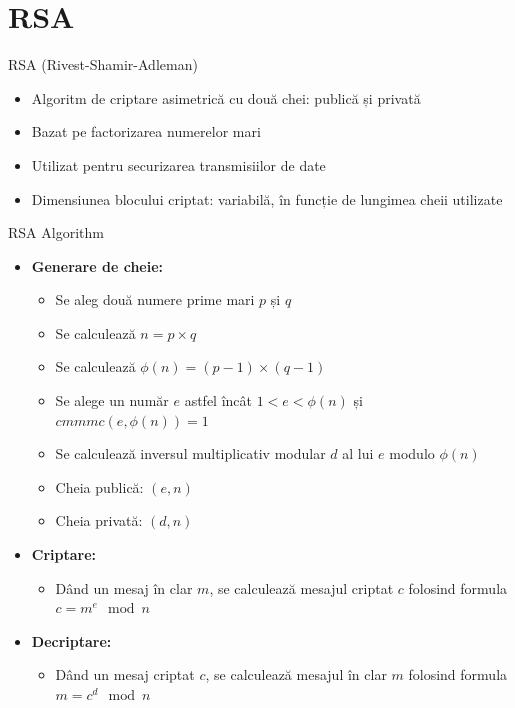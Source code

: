 \documentclass{beamer}
\begin{document}
\section{RSA}

\begin{frame}{RSA (Rivest-Shamir-Adleman)}
  \begin{itemize}
    \item Algoritm de criptare asimetrică cu două chei: publică și privată
    \item Bazat pe factorizarea numerelor mari
    \item Utilizat pentru securizarea transmisiilor de date
    \item Dimensiunea blocului criptat: variabilă, în funcție de lungimea cheii utilizate
  \end{itemize}
\end{frame}

\begin{frame}{RSA Algorithm}
  \begin{itemize}
    \item \textbf{Generare de cheie:}
    \begin{itemize}
      \item Se aleg două numere prime mari $p$ și $q$
      \item Se calculează $n = p \times q$
      \item Se calculează $\phi(n) = (p-1) \times (q-1)$
      \item Se alege un număr $e$ astfel încât $1 < e < \phi(n)$ și $cmmmc(e, \phi(n)) = 1$
      \item Se calculează inversul multiplicativ modular $d$ al lui $e$ modulo $\phi(n)$
      \item Cheia publică: $(e, n)$
      \item Cheia privată: $(d, n)$
    \end{itemize}
    \item \textbf{Criptare:}
    \begin{itemize}
      \item Dând un mesaj în clar $m$, se calculează mesajul criptat $c$ folosind formula $c = m^e \mod n$
    \end{itemize}
    \item \textbf{Decriptare:}
    \begin{itemize}
      \item Dând un mesaj criptat $c$, se calculează mesajul în clar $m$ folosind formula $m = c^d \mod n$
    \end{itemize}
  \end{itemize}
\end{frame}
\end{document}
